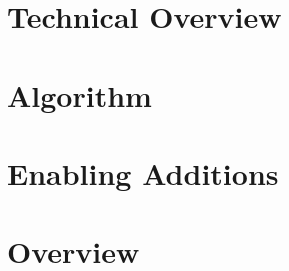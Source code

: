 \section{Technical Overview}



\section{Algorithm}



\section{Enabling Additions}



\section{Overview}



